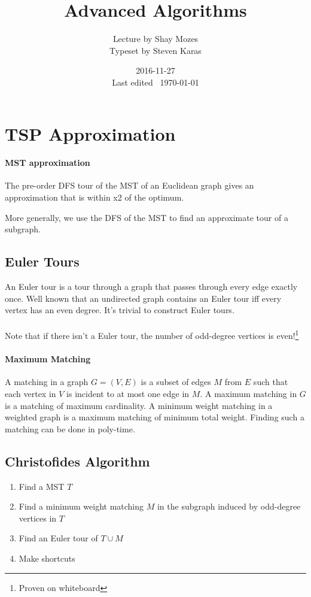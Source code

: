 \documentclass[a4paper]{article}
\title{Advanced Algorithms}
\date{2016-11-27 \\ Last edited \currenttime\ \today}
\author{Lecture by Shay Mozes\\Typeset by Steven Karas}
\begin{document}
\maketitle

\section{TSP Approximation}

\paragraph{MST approximation}
The pre-order DFS tour of the MST of an Euclidean graph gives an approximation that is within x2 of the optimum.

More generally, we use the DFS of the MST to find an approximate tour of a subgraph.

\subsection{Euler Tours}
An Euler tour is a tour through a graph that passes through every edge exactly once. Well known that an undirected graph contains an Euler tour iff every vertex has an even degree. It's trivial to construct Euler tours.

\paragraph{}
Note that if there isn't a Euler tour, the number of odd-degree vertices is even!\footnote{Proven on whiteboard}

\paragraph{Maximum Matching}
A matching in a graph $G=(V,E)$ is a subset of edges $M$ from $E$ such that each vertex in $V$ is incident to at most one edge in $M$. A maximum matching in $G$ is a matching of maximum cardinality. A minimum weight matching in a weighted graph is a maximum matching of minimum total weight. Finding such a matching can be done in poly-time.

\subsection{Christofides Algorithm}

\begin{enumerate}
  \item Find a MST $T$
  \item Find a minimum weight matching $M$ in the subgraph induced by odd-degree vertices in $T$
  \item Find an Euler tour of $T \cup M$
  \item Make shortcuts
\end{enumerate}
\end{document}
